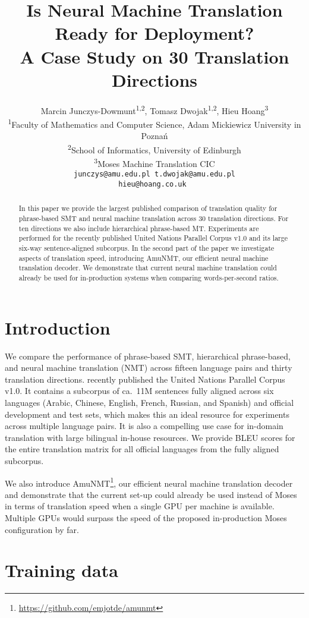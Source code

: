 \documentclass[11pt]{article}
\title{Is Neural Machine Translation Ready for Deployment? \\ A Case Study on 30 Translation Directions}
\author{Marcin Junczys-Dowmunt\textsuperscript{1,2}, Tomasz Dwojak\textsuperscript{1,2}, Hieu Hoang\textsuperscript{3} \\
\textsuperscript{1}Faculty of Mathematics and Computer Science, Adam Mickiewicz University in Pozna\'{n}\\
\textsuperscript{2}School of Informatics, University of Edinburgh \\
\textsuperscript{3}Moses Machine Translation CIC\\
{\tt \normalsize junczys@amu.edu\pgfplotsset{try min ticks=3}.pl t.dwojak@amu.edu.pl}\\
{\tt \normalsize hieu@hoang.co.uk }}
\date{}
\begin{document}
 \maketitle
\begin{abstract}
In this paper we provide the largest published comparison of translation quality for phrase-based SMT and neural machine translation across 30 translation directions. For ten directions we also include hierarchical phrase-based MT. Experiments are performed for the recently published United Nations Parallel Corpus v1.0 and its large six-way sentence-aligned subcorpus. 
In the second part of the paper we investigate aspects of translation speed, introducing AmuNMT, our efficient neural machine translation decoder. We demonstrate that current neural machine translation could already be used for in-production systems when comparing words-per-second ratios.

\end{abstract}

\section{Introduction}

We compare the performance of phrase-based SMT, hierarchical phrase-based, and neural machine translation (NMT) across fifteen language pairs and thirty translation directions.  recently published the United Nations Parallel Corpus v1.0. It contains a subcorpus of ca.~11M sentences fully aligned across six languages (Arabic, Chinese, English, French, Russian, and Spanish) and official development and test sets, which makes this an ideal resource for experiments across multiple language pairs. It is also a compelling use case for in-domain translation with large bilingual in-house resources. We provide BLEU scores for the entire translation matrix for all official languages from the fully aligned subcorpus. 

We also introduce AmuNMT\footnote{\url{https://github.com/emjotde/amunmt}}, our efficient neural machine translation decoder and demonstrate that the current set-up could already be used instead of Moses in terms of translation speed when a single GPU per machine is available. Multiple GPUs would surpass the speed of the proposed in-production Moses configuration by far. 

\section{Training data}
\end{document}

